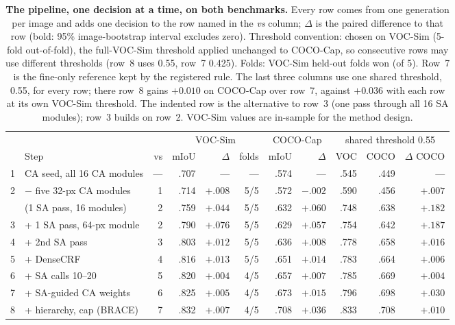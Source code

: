\begin{table}[t]
\centering
\caption{\textbf{The pipeline, one decision at a time, on both benchmarks.} Every row comes from one generation per image and adds one decision to the row named in the \emph{vs} column; $\Delta$ is the paired difference to that row (bold: 95\% image-bootstrap interval excludes zero). Threshold convention: chosen on VOC-Sim (5-fold out-of-fold), the full-VOC-Sim threshold applied unchanged to COCO-Cap, so consecutive rows may use different thresholds (row~8 uses 0.55, row~7 0.425). Folds: VOC-Sim held-out folds won (of 5). Row~7 is the fine-only reference kept by the registered rule. The last three columns use one shared threshold, 0.55, for every row; there row~8 gains $+0.010$ on COCO-Cap over row~7, against $+0.036$ with each row at its own VOC-Sim threshold. The indented row is the alternative to row~3 (one pass through all 16 SA modules); row~3 builds on row~2. VOC-Sim values are in-sample for the method design.}
\label{tab:progression}
\footnotesize\setlength{\tabcolsep}{2pt}
\begin{tabular}{@{}rlr rrr rr rrr@{}}
\toprule
 & & & \multicolumn{3}{c}{VOC-Sim} & \multicolumn{2}{c}{COCO-Cap} & \multicolumn{3}{c}{shared threshold 0.55} \\
\cmidrule(lr){4-6}\cmidrule(lr){7-8}\cmidrule(lr){9-11}
 & Step & vs & mIoU & $\Delta$ & folds & mIoU & $\Delta$ & VOC & COCO & $\Delta$ COCO \\
\midrule
1 & CA seed, all 16 CA modules & --- & .707 & --- & --- & .574 & --- & .545 & .449 & --- \\
2 & $-$ five 32-px CA modules & 1 & .714 & $\mathbf{+.008}$ & 5/5 & .572 & $-.002$ & .590 & .456 & $+.007$ \\
 & \quad(1 SA pass, 16 modules) & 2 & .759 & $\mathbf{+.044}$ & 5/5 & .632 & $\mathbf{+.060}$ & .748 & .638 & $\mathbf{+.182}$ \\
3 & + 1 SA pass, 64-px module & 2 & .790 & $\mathbf{+.076}$ & 5/5 & .629 & $\mathbf{+.057}$ & .754 & .642 & $\mathbf{+.187}$ \\
4 & + 2nd SA pass & 3 & .803 & $\mathbf{+.012}$ & 5/5 & .636 & $\mathbf{+.008}$ & .778 & .658 & $\mathbf{+.016}$ \\
5 & + DenseCRF & 4 & .816 & $\mathbf{+.013}$ & 5/5 & .651 & $\mathbf{+.014}$ & .783 & .664 & $\mathbf{+.006}$ \\
6 & + SA calls 10--20 & 5 & .820 & $\mathbf{+.004}$ & 4/5 & .657 & $\mathbf{+.007}$ & .785 & .669 & $\mathbf{+.004}$ \\
7 & + SA-guided CA weights & 6 & .825 & $+.005$ & 4/5 & .673 & $\mathbf{+.015}$ & .796 & .698 & $\mathbf{+.030}$ \\
8 & + hierarchy, cap (BRACE) & 7 & .832 & $\mathbf{+.007}$ & 4/5 & .708 & $\mathbf{+.036}$ & .833 & .708 & $+.010$ \\
\bottomrule
\end{tabular}
\end{table}
